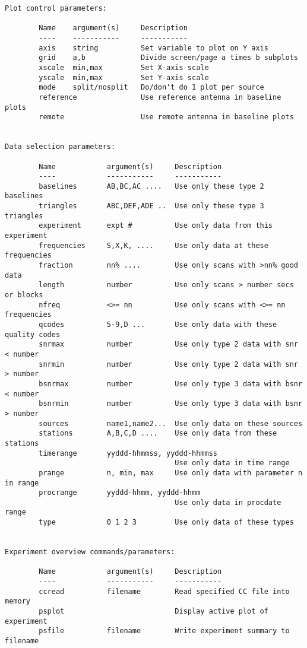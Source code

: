 \begin{list}{}{\setlength{\leftmargin}{0.5in}
     \setlength{\rightmargin}{0in}}
\begin{verbatim}
Plot control parameters:

        Name    argument(s)     Description
        ----    -----------     -----------
        axis    string          Set variable to plot on Y axis
        grid    a,b             Divide screen/page a times b subplots
        xscale  min,max         Set X-axis scale
        yscale  min,max         Set Y-axis scale
        mode    split/nosplit   Do/don't do 1 plot per source
        reference               Use reference antenna in baseline plots
        remote                  Use remote antenna in baseline plots


Data selection parameters:

        Name            argument(s)     Description
        ----            -----------     -----------
        baselines       AB,BC,AC ....   Use only these type 2 baselines
        triangles       ABC,DEF,ADE ..  Use only these type 3 triangles
        experiment      expt #          Use only data from this experiment
        frequencies     S,X,K, ....     Use only data at these frequencies
        fraction        nn% ....        Use only scans with >nn% good data
        length          number          Use only scans > number secs or blocks
        nfreq           <>= nn          Use only scans with <>= nn frequencies
        qcodes          5-9,D ...       Use only data with these quality codes
        snrmax          number          Use only type 2 data with snr < number
        snrmin          number          Use only type 2 data with snr > number
        bsnrmax         number          Use only type 3 data with bsnr < number
        bsnrmin         number          Use only type 3 data with bsnr > number
        sources         name1,name2...  Use only data on these sources
        stations        A,B,C,D ....    Use only data from these stations
        timerange       yyddd-hhmmss, yyddd-hhmmss      
                                        Use only data in time range
        prange          n, min, max     Use only data with parameter n in range
        procrange       yyddd-hhmm, yyddd-hhmm  
                                        Use only data in procdate range
        type            0 1 2 3         Use only data of these types


Experiment overview commands/parameters:

        Name            argument(s)     Description
        ----            -----------     -----------
        ccread          filename        Read specified CC file into memory
        psplot                          Display active plot of experiment
        psfile          filename        Write experiment summary to filename


\end{verbatim}
\end{list}

